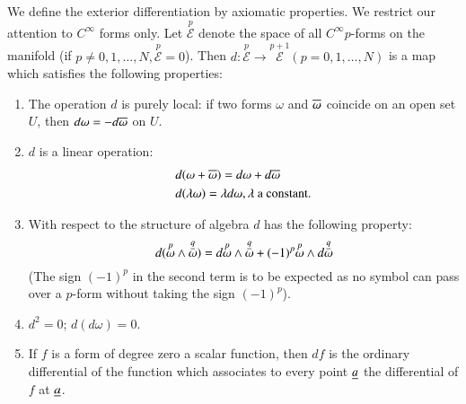 We define the exterior differentiation by axiomatic properties. We
restrict our attention to $C^{\infty}$ forms only. Let
$\overset{p}{\mathscr{E}}$ denote the space of all $C^{\infty}p$-forms
on the manifold (if $p\neq
0,1,\ldots,N,\overset{p}{\mathscr{E}}=0$). Then
$d:\overset{p}{\mathscr{E}}\to
\overset{p+1}{\mathscr{E}}(p=0,1,\ldots,N)$ is a map which satisfies
the following properties:
\begin{enumerate}
\renewcommand{\labelenumi}{\theenumi)}
\item The operation $d$ is purely local: if two forms $\omega$ and
  $\overline{\omega}$ coincide on an open set $U$, then
  $d\omega= -d\overline{\omega}$ on $U$.

\item $d$ is a linear operation:
\begin{align*}
& d(\omega+\overline{\omega})=d\omega+d\overline{\omega}\\
& d(\lambda\omega)=\lambda d\omega,\lambda \text{ a constant.}
\end{align*}

\item With respect to the structure of algebra $d$ has the following
  property:
$$
d(\overset{p}{\omega}\wedge
\overset{\underline{q}}{\omega})=d\overset{p}{\omega}\wedge
\overset{\underline{q}}{\omega}+(-1)^{p}\overset{p}{\omega}\wedge
d\overset{\underline{q}}{\omega} 
$$
(The sign $(-1)^{p}$ in the second term is to be expected as no symbol
can pass over a $p$-form without taking the sign $(-1)^{p}$).

\item $d^{2}=0$; \iec $d(d\omega)=0$.

\item If $f$ is a form of degree zero \iec a scalar function, then
  $df$ is the ordinary differential of the function which associates
  to every point $\underline{a}$ the differential of $f$ at $\underline{a}$.

\end{enumerate}


